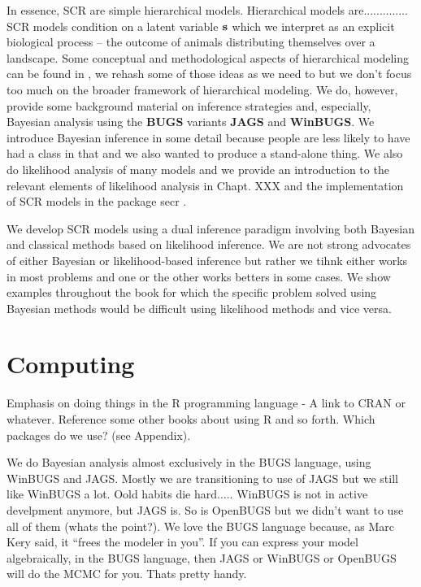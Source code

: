 In essence, SCR
are simple hierarchical models. 
Hierarchical models are..............
SCR models condition on a latent variable ${\bf s}$ which we interpret
as an explicit biological process -- the outcome of animals
distributing themselves over a landscape.  Some conceptual and
methodological aspects of hierarchical modeling can be found in
\citet{royle_dorazio:2008}, we rehash some of those ideas as we need
to but we don't focus too much on the broader framework of
hierarchical modeling.
We do, however, 
 provide some background material on inference strategies and,
 especially, Bayesian analysis using the  {\bf BUGS} variants {\bf
   JAGS} and {\bf WinBUGS}. We introduce Bayesian inference in some
 detail because people are less likely to have had a class in that and
 we also wanted to produce a stand-alone thing.   We also do
 likelihood analysis of many models and we provide an introduction to
 the relevant elements of likelihood analysis in Chapt. XXX and the
 implementation of SCR models in the package secr \citep{efford_etal:2009euring}.

We develop SCR models using a dual inference paradigm involving both
Bayesian and classical methods based on likelihood inference.
We are not strong advocates of either Bayesian or likelihood-based
inference but rather we tihnk either works in most problems and one or
the other works betters in some cases. 
We show examples throughout the
book for which the specific problem solved using Bayesian methods
would be difficult using likelihood methods and vice versa.


\section{Computing}

Emphasis on doing things in the 
R programming language  - A link to CRAN or whatever. Reference some
other books about using R and so forth. Which packages do we use? (see
Appendix). 

We do Bayesian analysis almost exclusively in the BUGS language, using
WinBUGS and JAGS. Mostly we are transitioning to use of JAGS but we
still like WinBUGS a lot. Oold habits die hard..... WinBUGS is not in
active develpment anymore, but JAGS is. So is OpenBUGS but we didn't
want to use all of them (whats the point?). We love the BUGS language
because, as Marc Kery said, it ``frees the modeler in you''.
If you can express your model algebraically, in the BUGS language,
then JAGS or WinBUGS or OpenBUGS will do the MCMC for you. Thats
pretty handy.

